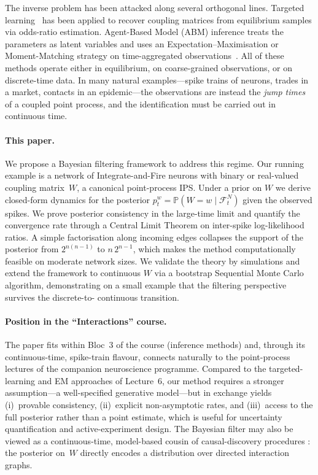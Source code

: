\documentclass[11pt,a4paper]{article}
\theoremstyle{definition}
\newcommand{\Prob}{\mathbb{P}}
\newcommand{\cF}{\mathcal{F}}
\begin{document}
The inverse problem has been attacked along several orthogonal lines.
Targeted learning~\citep{vanderLaanRose2011} has been applied to recover coupling matrices from equilibrium samples via odds-ratio estimation. Agent-Based Model (ABM)
inference treats the parameters as latent variables and uses an
Expectation--Maximisation or Moment-Matching strategy on
time-aggregated observations~\citep{Banisch2015}. All of these methods operate either in
equilibrium, on coarse-grained observations, or on discrete-time data.
In many natural examples---spike trains of neurons, trades in a market,
contacts in an epidemic---the observations are instead the
\emph{jump times} of a coupled point process, and the identification
must be carried out in continuous time.

\paragraph{This paper.} We propose a Bayesian filtering framework to
address this regime. Our running example is a network of
Integrate-and-Fire neurons with binary or real-valued coupling
matrix~$W$, a canonical point-process IPS. Under a prior on $W$ we
derive closed-form dynamics for the posterior $p_t^w = \Prob(W = w \mid
\cF_t^{N})$ given the observed spikes. We prove posterior consistency
in the large-time limit and quantify the convergence rate through a
Central Limit Theorem on inter-spike log-likelihood ratios. A simple
factorisation along incoming edges collapses the support of the
posterior from $2^{n(n-1)}$ to $n\,2^{n-1}$, which makes the method
computationally feasible on moderate network sizes. We validate
the theory by simulations and extend the framework to continuous $W$
via a bootstrap Sequential Monte Carlo algorithm, demonstrating on a
small example that the filtering perspective survives the discrete-to-
continuous transition.

\paragraph{Position in the ``Interactions'' course.} The paper fits
within Bloc~3 of the course (inference methods) and, through its
continuous-time, spike-train flavour, connects naturally to the
point-process lectures of the companion neuroscience programme.
Compared to the targeted-learning and EM approaches of Lecture~6, our
method requires a stronger assumption---a well-specified generative
model---but in exchange yields (i)~provable consistency, (ii)~explicit
non-asymptotic rates, and (iii)~access to the full posterior rather
than a point estimate, which is useful for uncertainty quantification
and active-experiment design. The Bayesian filter may also be viewed as
a continuous-time, model-based cousin of causal-discovery procedures
\citep{Pearl2009,Manzo2022}: the posterior on~$W$ directly encodes a
distribution over directed interaction graphs.
\end{document}
